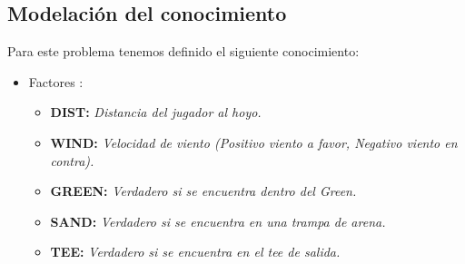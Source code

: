 \documentclass[runningheads,a4paper]{llncs}
\begin{document}
\subsection{Modelación del conocimiento}
Para este problema tenemos definido el siguiente conocimiento:\\
\begin{itemize}
	\item Factores :
	\\
	\begin{itemize}
    \item \textbf{DIST:} \textit{Distancia del jugador al hoyo.}
    \item \textbf{WIND:} \textit{Velocidad de viento (Positivo viento a favor, Negativo viento en contra).}
    \item \textbf{GREEN:} \textit{Verdadero si se encuentra dentro del Green.}
    \item \textbf{SAND:} \textit{Verdadero si se encuentra en una trampa de arena.}
    \item \textbf{TEE:} \textit{Verdadero si se encuentra en el tee de salida.}\\
	\end{itemize}
	

\end{itemize}
\end{document}
